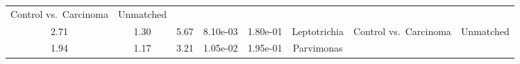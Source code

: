 \documentclass[12pt,]{article}
\begin{document}
\begin{longtable}[]{@{}cccccccc@{}}
\begin{minipage}[t]{0.14\columnwidth}
Control vs.~Carcinoma\strut
\end{minipage} & \begin{minipage}[t]{0.09\columnwidth}\centering\strut
Unmatched\strut
\end{minipage}\tabularnewline
\begin{minipage}[t]{0.05\columnwidth}\centering\strut
2.71\strut
\end{minipage} & \begin{minipage}[t]{0.09\columnwidth}\centering\strut
1.30\strut
\end{minipage} & \begin{minipage}[t]{0.09\columnwidth}\centering\strut
5.67\strut
\end{minipage} & \begin{minipage}[t]{0.07\columnwidth}\centering\strut
8.10e-03\strut
\end{minipage} & \begin{minipage}[t]{0.07\columnwidth}\centering\strut
1.80e-01\strut
\end{minipage} & \begin{minipage}[t]{0.20\columnwidth}\centering\strut
Leptotrichia\strut
\end{minipage} & \begin{minipage}[t]{0.14\columnwidth}\centering\strut
Control vs.~Carcinoma\strut
\end{minipage} & \begin{minipage}[t]{0.09\columnwidth}\centering\strut
Unmatched\strut
\end{minipage}\tabularnewline
\begin{minipage}[t]{0.05\columnwidth}\centering\strut
1.94\strut
\end{minipage} & \begin{minipage}[t]{0.09\columnwidth}\centering\strut
1.17\strut
\end{minipage} & \begin{minipage}[t]{0.09\columnwidth}\centering\strut
3.21\strut
\end{minipage} & \begin{minipage}[t]{0.07\columnwidth}\centering\strut
1.05e-02\strut
\end{minipage} & \begin{minipage}[t]{0.07\columnwidth}\centering\strut
1.95e-01\strut
\end{minipage} & \begin{minipage}[t]{0.20\columnwidth}\centering\strut
Parvimonas\strut
\end{minipage} & \begin{minipage}[t]{0.14\columnwidth}\centering\strut

\end{minipage}
\end{longtable}
\end{document}
